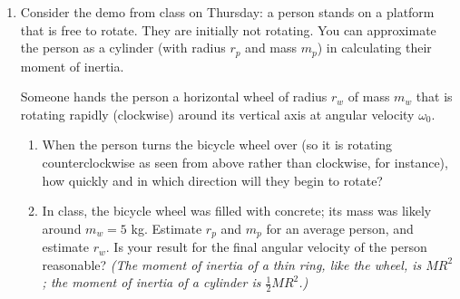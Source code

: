 \documentclass[12pt]{article}
\begin{document}
\begin{enumerate}
		{\bf Hint 1:} The ``third kinematics relation'' $v_f^2 - v_0^2 = 2a\Delta x$ that you derived back in February will be very useful here, since you are never interested in the {\it time} these motions take, but care about relating the change in velocity to the distance traveled and the acceleration.

		{\bf Hint 2:} There are multiple things that happen here. Conservation of momentum will help you understand some of them, but not others. First, draw four cartoons, and identify which method you can use to understand how to connect each cartoon to the next:

		\begin{itemize}
	\item Right after Alice slides the puck to Bob
	\item Right before Bob picks up the puck
	\item Right after Bob picks up the puck
	\item When Bob comes to rest
		\end{itemize}



\bigskip\bigskip
\newpage
	\item Consider the demo from class on Thursday: a person stands on a platform that is free to rotate. They are initially not rotating. You can approximate the person as a cylinder (with radius $r_p$ and mass $m_p$) in calculating their moment of inertia.
	
		Someone hands the person a horizontal wheel of radius $r_w$ of mass $m_w$ that is rotating rapidly (clockwise) around its vertical axis at angular velocity $\omega_0$.

		\begin{enumerate}
			\item When the person turns the bicycle wheel over (so it is rotating counterclockwise as seen from above rather than clockwise, for instance), how quickly and in which direction will they begin to rotate?

			\item In class, the bicycle wheel was filled with concrete; its mass was likely around $m_w = 5$ kg. Estimate $r_p$ and $m_p$ for an average person, and estimate $r_w$. Is your result for the final angular velocity of the person reasonable? {\it (The moment of inertia of a thin ring, like the wheel, is $MR^2$; the moment of inertia of a cylinder is $\frac{1}{2}MR^2$.)}
		\end{enumerate}


\end{enumerate}
\end{document}

